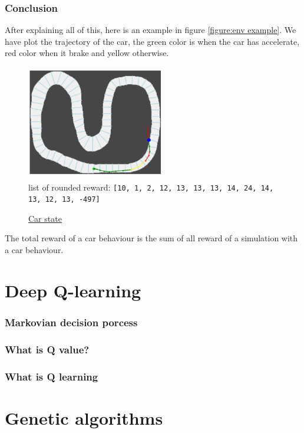 \documentclass[11pt,a4paper]{article}
\newcounter{fig}
\begin{document}
		\section{Conclusion}
After explaining all of this, here is an example in figure \ref{figure:env example}. We have plot the trajectory of the car, the green color is when the car has accelerate, red color when it brake and yellow otherwise.
\begin{center}
\label{figure:env example}
	\begin{figure}[ht]
		\centering
		\includegraphics[width=6cm, height=5cm]{env_example.png}\\
		list of rounded reward: \texttt{[10, 1, 2, 12, 13, 13, 13, 14, 24, 14, 13, 12, 13, -497]}
		\caption{\underline{Car state}}
	\end{figure}
\end{center}
The total reward of a car behaviour is the sum of all reward of a simulation with a car behaviour.

	\part{Deep Q-learning}
		\section{Markovian decision porcess}
		
		\section{What is Q value?}
		
		\section{What is Q learning}

	
	\part{Genetic algorithms}
\end{document}
